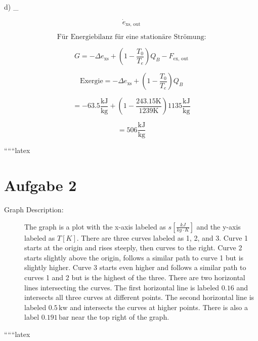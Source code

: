 d) \quad {}_{}

\[
\dot{e}_{\text{xs, out}}
\]

\[
\text{Für Energiebilanz für eine stationäre Strömung:}
\]

\[
G = -\Delta e_{\text{xs}} + \left( 1 - \frac{T_0}{T_e} \right) Q_B - F_{\text{ex, out}}
\]

\[
\text{Exergie} = -\Delta e_{\text{xs}} + \left( 1 - \frac{T_0}{T_e} \right) Q_B
\]

\[
= -63.5 \frac{\text{kJ}}{\text{kg}} + \left( 1 - \frac{243.15 \text{K}}{1239 \text{K}} \right) 1135 \frac{\text{kJ}}{\text{kg}}
\]

\[
= 506 \frac{\text{kJ}}{\text{kg}}
\]

``````latex


\section*{Aufgabe 2}

\begin{description}
    \item[Graph Description:] The graph is a plot with the x-axis labeled as $s \left[ \frac{kJ}{kg \cdot K} \right]$ and the y-axis labeled as $T \left[ K \right]$. There are three curves labeled as 1, 2, and 3. Curve 1 starts at the origin and rises steeply, then curves to the right. Curve 2 starts slightly above the origin, follows a similar path to curve 1 but is slightly higher. Curve 3 starts even higher and follows a similar path to curves 1 and 2 but is the highest of the three. There are two horizontal lines intersecting the curves. The first horizontal line is labeled $0.16$ and intersects all three curves at different points. The second horizontal line is labeled $0.5 \, \text{kw}$ and intersects the curves at higher points. There is also a label $0.191 \, \text{bar}$ near the top right of the graph.
\end{description}

``````latex